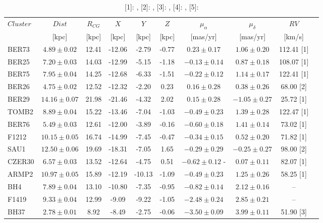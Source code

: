 \documentclass[draft]{aa}
\begin{document}
\begin{appendix}
  \begin{table}
   \caption{[1]: \cite{Tarricq_2021}, [2]: \cite{Dias_2002}, [3]:
   \cite{Soubiran_2018}, [4]: \cite{Dias_2007}, [5]: \cite{Frinchaboy_2006}}
   \label{tab:velocities}
   \centering
   \renewcommand{\arraystretch}{1.3}
   \begin{tabular}{lccccccccc}
    \hline \hline
    $Cluster$ & $Dist$ & $R_{CG}$ & $X$ & $Y$ & $Z$ & $\mu_{\alpha}$ & $\mu_{\delta}$ & $RV$\\
     & [kpc] & [kpc] & [kpc] & [kpc] & [kpc] & [mas/yr] & [mas/yr] & [km/s]\\
    \hline
    BER73 & $4.89 \pm 0.02$ & 12.41 & -12.06 & -2.79 & -0.77 & $0.23\pm 0.17$ & $1.06 \pm 0.20$ & 112.41 [1]\\
    BER25 & $7.20 \pm 0.03$& 14.03 & -12.99 & -5.15 & -1.18 & $-0.13 \pm 0.14$ & $0.87 \pm 0.18$ & 108.07 [1]\\
    BER75 & $7.95 \pm 0.04$ & 14.25 & -12.68 & -6.33 & -1.51 & $-0.22 \pm 0.12$ & $1.14 \pm 0.17$ & 122.41 [1]\\
    BER26 & $4.75 \pm 0.02$ & 12.52 & -12.32 & -2.20 & 0.23 & $0.16 \pm 0.28$ & $0.38 \pm 0.26$ & 68.00 [2]\\
    BER29 & $14.16 \pm 0.07$ & 21.98 & -21.46 & -4.32 & 2.02 & $0.15 \pm 0.28$ & $-1.05 \pm 0.27$ & 25.72 [1] \\
    TOMB2 & $8.89 \pm 0.04$ & 15.22 & -13.46 & -7.04 & -1.03 & $-0.49 \pm 0.23$ & $1.39 \pm 0.28$ & 122.47 [1]\\
    BER76 & $5.49 \pm 0.03$ & 12.61 & -12.00 & -3.89 & -0.16 & $-0.60 \pm 0.18$ & $1.41 \pm 0.14$ & 73.02 [1]\\
    F1212 & $10.15 \pm 0.05$ & 16.74 & -14.99 & -7.45 & -0.47 & $-0.34 \pm 0.15$ & $0.52 \pm 0.20$ & 71.82 [1]\\
    SAU1 & $12.50 \pm 0.06$ & 19.69 & -18.31 & -7.05 & 1.65 & $-0.29 \pm 0.29$ & $-0.25 \pm 0.27$ & 98.00 [2]\\
    CZER30 & $6.57 \pm 0.03$ & 13.52 & -12.64 & -4.75 & 0.51 & $-0.62 \pm 0.12$ -& $0.07 \pm 0.11$ & 82.07 [1]\\
    ARMP2 & $10.97 \pm 0.05$ & 15.89 & -12.19 & -10.13 & -1.09 & $-0.49 \pm 0.23$ & $1.25 \pm 0.26$ & 58.25 [1]\\
    BH4 & $7.89 \pm 0.04$ & 13.10 & -10.80 & -7.35 & -0.95 & $-0.82 \pm 0.14$ & $2.12 \pm 0.16$ & -- \\
    F1419 & $9.33 \pm 0.04$ & 12.99 & -9.09 & -9.22 & -1.05 & $-2.48 \pm 0.24$ & $2.85 \pm 0.21$ & --\\
    BH37 & $2.78 \pm 0.01$ & 8.92 & -8.49 & -2.75 & -0.06 & $-3.50 \pm 0.09$ & $3.99 \pm 0.11$ & 51.90 [3]\\

\end{tabular}
\end{table}
\end{appendix}
\end{document}
